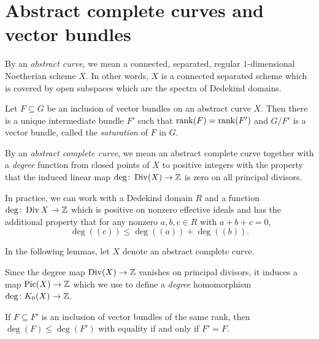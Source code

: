 \section{Abstract complete curves and vector bundles}

\begin{definition} \label{def:abstract curve}
By an \emph{abstract curve}, we mean a connected, separated, regular $1$-dimensional Noetherian scheme $X$. In other words, $X$ is a connected separated scheme which is covered by open subspaces which are the spectra of Dedekind domains.
\end{definition}

\begin{definition} \label{def:saturation}
Let $F \subseteq G$ be an inclusion of vector bundles on an abstract curve $X$.
Then there is a unique intermediate bundle $F'$ such that $\operatorname{rank}(F) = \operatorname{rank}(F')$ and $G/F'$ is a vector bundle, called the \emph{saturation} of $F$ in $G$.
\end{definition}


\begin{definition} \label{def:abstract complete curve}
By an \emph{abstract complete curve}, we mean an abstract complete curve
together with a \emph{degree} function from closed points of $X$ to positive integers with the property that the induced linear map $\deg\colon \operatorname{Div}(X) \to \mathbb{Z}$ is zero on all principal divisors.

In practice, we can work with a Dedekind domain $R$ and a function $\deg\colon 
\operatorname{Div} X \to \mathbb{Z}$ which is positive on nonzero effective ideals and has the additional property that for any nonzero $a,b,c \in R$ with $a+b+c=0$, 
\[
\deg((c)) \leq \deg((a)) + \deg((b)).
\]
\end{definition}

In the following lemmas, let $X$ denote an abstract complete curve.

\begin{definition} \label{def:degree map}
Since the degree map $\operatorname{Div}(X) \to \mathbb{Z}$ vanishes on principal divisors, it induces a map $\operatorname{Pic}(X) \to \mathbb{Z}$
which we use to define a \emph{degree} homomorphism $\deg\colon K_0(X) \to \mathbb{Z}$.

If $F \subseteq F'$ is an inclusion of vector bundles of the same rank, then
$\deg(F) \leq \deg(F')$ with equality if and only if $F' = F$.
\end{definition}

